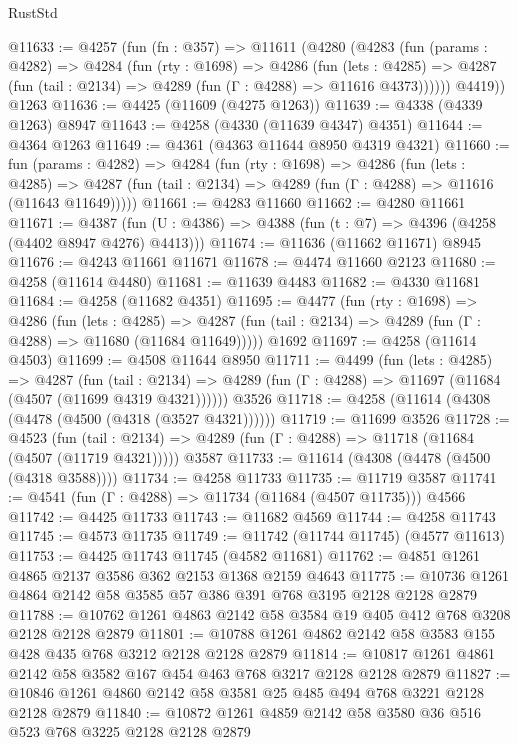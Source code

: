 \begin{lexlean}{RustStd}
\begin{coremodule}
@11633 := @4257
    (fun (fn : @357) =>
    @11611
      (@4280
        (@4283
          (fun (params : @4282) =>
          @4284
            (fun (rty : @1698) =>
            @4286
              (fun (lets : @4285) =>
              @4287 (fun (tail : @2134) => @4289 (fun (Γ : @4288) => @11616 @4373))))))
        @4419))
    @1263
@11636 := @4425 (@11609 (@4275 @1263))
@11639 := @4338 (@4339 @1263) @8947
@11643 := @4258 (@4330 (@11639 @4347) @4351)
@11644 := @4364 @1263
@11649 := @4361 (@4363 @11644 @8950 @4319 @4321)
@11660 := fun (params : @4282) =>
  @4284
    (fun (rty : @1698) =>
    @4286
      (fun (lets : @4285) =>
      @4287 (fun (tail : @2134) => @4289 (fun (Γ : @4288) => @11616 (@11643 @11649)))))
@11661 := @4283 @11660
@11662 := @4280 @11661
@11671 := @4387 (fun (U : @4386) => @4388 (fun (t : @7) => @4396 (@4258 (@4402 @8947 @4276) @4413)))
@11674 := @11636 (@11662 @11671) @8945
@11676 := @4243 @11661 @11671
@11678 := @4474 @11660 @2123
@11680 := @4258 (@11614 @4480)
@11681 := @11639 @4483
@11682 := @4330 @11681
@11684 := @4258 (@11682 @4351)
@11695 := @4477
    (fun (rty : @1698) =>
    @4286
      (fun (lets : @4285) =>
      @4287 (fun (tail : @2134) => @4289 (fun (Γ : @4288) => @11680 (@11684 @11649)))))
    @1692
@11697 := @4258 (@11614 @4503)
@11699 := @4508 @11644 @8950
@11711 := @4499
    (fun (lets : @4285) =>
    @4287
      (fun (tail : @2134) =>
      @4289 (fun (Γ : @4288) => @11697 (@11684 (@4507 (@11699 @4319 @4321))))))
    @3526
@11718 := @4258 (@11614 (@4308 (@4478 (@4500 (@4318 (@3527 @4321))))))
@11719 := @11699 @3526
@11728 := @4523
    (fun (tail : @2134) => @4289 (fun (Γ : @4288) => @11718 (@11684 (@4507 (@11719 @4321)))))
    @3587
@11733 := @11614 (@4308 (@4478 (@4500 (@4318 @3588))))
@11734 := @4258 @11733
@11735 := @11719 @3587
@11741 := @4541 (fun (Γ : @4288) => @11734 (@11684 (@4507 @11735))) @4566
@11742 := @4425 @11733
@11743 := @11682 @4569
@11744 := @4258 @11743
@11745 := @4573 @11735
@11749 := @11742 (@11744 @11745) (@4577 @11613)
@11753 := @4425 @11743 @11745 (@4582 @11681)
@11762 := @4851 @1261 @4865 @2137 @3586 @362 @2153 @1368 @2159 @4643
@11775 := @10736 @1261 @4864 @2142 @58 @3585 @57 @386 @391 @768 @3195 @2128 @2128 @2879
@11788 := @10762 @1261 @4863 @2142 @58 @3584 @19 @405 @412 @768 @3208 @2128 @2128 @2879
@11801 := @10788 @1261 @4862 @2142 @58 @3583 @155 @428 @435 @768 @3212 @2128 @2128 @2879
@11814 := @10817 @1261 @4861 @2142 @58 @3582 @167 @454 @463 @768 @3217 @2128 @2128 @2879
@11827 := @10846 @1261 @4860 @2142 @58 @3581 @25 @485 @494 @768 @3221 @2128 @2128 @2879
@11840 := @10872 @1261 @4859 @2142 @58 @3580 @36 @516 @523 @768 @3225 @2128 @2128 @2879

\end{coremodule}
\end{lexlean}
